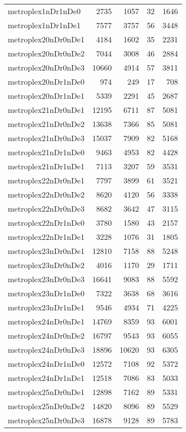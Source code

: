 \begin{longtable}{lrrrr}
metroplex1nDr1nDe0 & 2735 & 1057 & 32 & 1646 \\
metroplex1nDr1nDe1 & 7577 & 3757 & 56 & 3448 \\
metroplex20nDr0nDe1 & 4184 & 1602 & 35 & 2231 \\
metroplex20nDr0nDe2 & 7044 & 3008 & 46 & 2884 \\
metroplex20nDr0nDe3 & 10660 & 4914 & 57 & 3811 \\
metroplex20nDr1nDe0 & 974 & 249 & 17 & 708 \\
metroplex20nDr1nDe1 & 5339 & 2291 & 45 & 2687 \\
metroplex21nDr0nDe1 & 12195 & 6711 & 87 & 5081 \\
metroplex21nDr0nDe2 & 13638 & 7366 & 85 & 5081 \\
metroplex21nDr0nDe3 & 15037 & 7909 & 82 & 5168 \\
metroplex21nDr1nDe0 & 9463 & 4953 & 82 & 4428 \\
metroplex21nDr1nDe1 & 7113 & 3207 & 59 & 3531 \\
metroplex22nDr0nDe1 & 7797 & 3899 & 61 & 3521 \\
metroplex22nDr0nDe2 & 8620 & 4120 & 56 & 3338 \\
metroplex22nDr0nDe3 & 8682 & 3642 & 47 & 3115 \\
metroplex22nDr1nDe0 & 3780 & 1580 & 43 & 2157 \\
metroplex22nDr1nDe1 & 3228 & 1076 & 31 & 1805 \\
metroplex23nDr0nDe1 & 12810 & 7158 & 88 & 5248 \\
metroplex23nDr0nDe2 & 4016 & 1170 & 29 & 1711 \\
metroplex23nDr0nDe3 & 16641 & 9083 & 88 & 5592 \\
metroplex23nDr1nDe0 & 7322 & 3638 & 68 & 3616 \\
metroplex23nDr1nDe1 & 9546 & 4934 & 71 & 4225 \\
metroplex24nDr0nDe1 & 14769 & 8359 & 93 & 6001 \\
metroplex24nDr0nDe2 & 16797 & 9543 & 93 & 6055 \\
metroplex24nDr0nDe3 & 18896 & 10620 & 93 & 6305 \\
metroplex24nDr1nDe0 & 12572 & 7108 & 92 & 5372 \\
metroplex24nDr1nDe1 & 12518 & 7086 & 83 & 5033 \\
metroplex25nDr0nDe1 & 12898 & 7162 & 89 & 5331 \\
metroplex25nDr0nDe2 & 14820 & 8096 & 89 & 5529 \\
metroplex25nDr0nDe3 & 16878 & 9128 & 89 & 5783 \\

\end{longtable}
